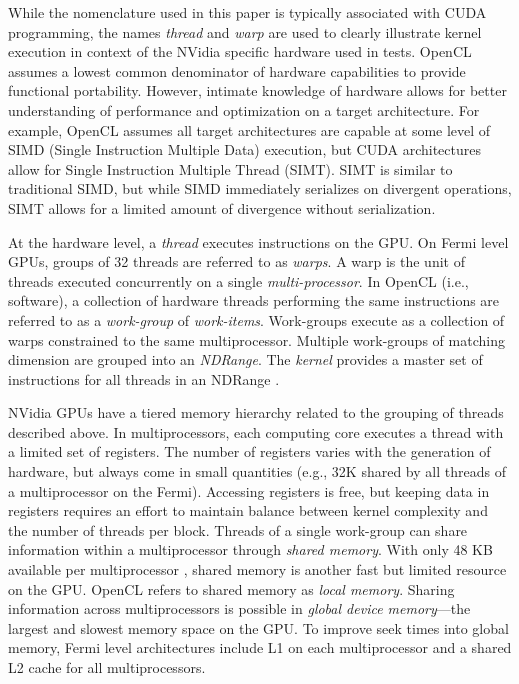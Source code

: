 \documentclass{report}
\begin{document}
While the nomenclature used in this paper is typically associated with CUDA programming, the names \textit{thread} and \textit{warp} are used to clearly illustrate kernel execution in context of the NVidia specific hardware used in tests. OpenCL assumes a lowest common denominator of hardware capabilities to provide functional portability. However, intimate knowledge of hardware allows for better understanding of performance and optimization on a target architecture. For example, OpenCL assumes all target architectures are capable at some level of SIMD (Single Instruction Multiple Data) execution, but CUDA architectures allow for Single Instruction Multiple Thread (SIMT). SIMT is similar to traditional SIMD, but while SIMD immediately serializes on divergent operations, SIMT allows for a limited amount of divergence without serialization. 

At the hardware level, a \textit{thread} executes instructions on the GPU. On Fermi level GPUs, groups of 32 threads are referred to as \textit{warps}. A warp is the unit of threads executed concurrently on a single \textit{multi-processor}. 
In OpenCL (i.e., software), a collection of hardware threads performing the same instructions are referred to as a \textit{work-group} of \textit{work-items}. Work-groups execute as a collection of warps constrained to the same multiprocessor. Multiple work-groups of matching dimension are grouped into an \textit{NDRange}. The \textit{kernel} provides a master set of instructions
for all threads in an NDRange \cite{OpenCL2009}. 


NVidia GPUs have a tiered memory hierarchy related to the grouping of threads described above. 
In multiprocessors, each computing core executes a thread with a limited set of registers. The number of registers varies with the generation of hardware, but always come in small quantities (e.g., 32K shared by all threads of a multiprocessor on the Fermi). Accessing registers is free, but keeping data in registers requires an effort to maintain balance between kernel complexity and the number of threads per block. Threads of a single work-group can share information within a multiprocessor through \textit{shared memory}. With only 48 KB 
available per 
multiprocessor \cite{CudaGuide2011}, shared memory is another fast but limited resource on the GPU. OpenCL refers to shared memory as \textit{local memory}. 
Sharing information across multiprocessors is possible in \textit{global device memory}---the largest and slowest memory space on the GPU. To improve seek times into global memory, Fermi level architectures include L1 on each multiprocessor and a shared L2 cache for all multiprocessors.
\end{document}
